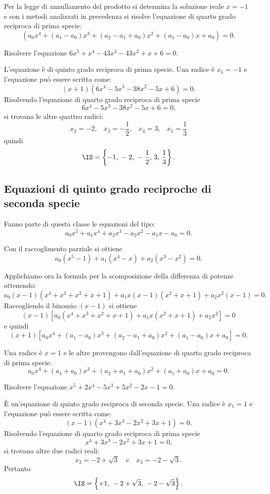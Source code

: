 Per la legge di annullamento del prodotto si determina la soluzione reale $x=-1$ e con i metodi analizzati in precedenza si risolve l'equazione di quarto grado reciproca di prima specie: 
\[\left(a_0x^4+(a_1-a_0)x^3+(a_2-a_1+a_0)x^2+(a_1-a_0)x+a_0\right)=0.\]
\pagebreak
\begin{exrig}
 \begin{esempio}
 Risolvere l'equazione $6x^5+x^4-43x^3-43x^2+x+6=0$.

 L'equazione è di quinto grado reciproca di prima specie. Una radice è $x_1=-1$ e l'equazione può essere scritta come: 
\[(x+1)\left(6x^4-5x^3-38x^2-5x+6\right)=0.\]
 Risolvendo l'equazione di quarto grado reciproca di prima specie 
\[6x^4-5x^3-38x^2-5x+6=0\text{,}\] 
si trovano le altre quattro radici: 
\[x_2=-2\text{,}\quad x_3=-\frac 1 2\text{,}\quad x_4=3\text{,}\quad x_5=\frac{1}{3}\] quindi 
\[\IS=\left\{-1\text{, }-2\text{, }-\frac 1 2\text{, }3\text{, }\frac 1 3\right\}.\]
 \end{esempio}
\end{exrig}

\subsection{Equazioni di quinto grado reciproche di seconda specie}
Fanno parte di questa classe le equazioni del tipo:
\[a_0x^5+a_1x^4+a_2x^3-a_2x^2-a_1x-a_0=0.\]

Con il raccoglimento parziale si ottiene 
\[a_0\left(x^5-1\right)+a_1\left(x^4-x\right)+a_2\left(x^3-x^2\right)=0.\]

 Applichiamo ora la formula per la scomposizione della differenza di potenze ottenendo: 
\[a_0(x-1)\left(x^4+x^3+x^2+x+1\right)+a_1x(x-1)\left(x^2+x+1\right)+a_2x^2(x-1)=0.\] 
Raccogliendo il binomio $(x-1)$ si ottiene 
\[(x-1)\left[a_0\left(x^4+x^3+x^2+x+1\right)+a_1x\left(x^2+x+1\right)+a_2x^2\right]=0\] e quindi 
\[(x+1)\left[a_0x^4+(a_1-a_0)x^3+(a_2-a_1+a_0)x^2+(a_1-a_0)x+a_0\right]=0.\]

Una radice è $x=1$ e le altre provengono dall'equazione di quarto grado reciproca di prima specie: \[a_0x^4+(a_1+a_0)x^3+(a_2+a_1+a_0)x^2+(a_1+a_0)x+a_0=0.\]
\pagebreak
\begin{exrig}
 \begin{esempio}
 Risolvere l'equazione $x^5+2x^4-5x^3+5x^2-2x-1=0$.

 È un'equazione di quinto grado reciproca di seconda specie. Una radice è $x_1=1$ e l'equazione può essere scritta come: 
\[(x-1)\left(x^4+3x^3-2x^2+3x+1\right)=0.\] 
Risolvendo l'equazione di quarto grado reciproca di prima specie 
\[x^4+3x^3-2x^2+3x+1=0\text{,}\] si trovano altre due radici reali: 
\[x_2=-2+\sqrt 3\quad\text{e}\quad x_3=-2-\sqrt 3.\] 
Pertanto 
\[\IS=\left\{+1\text{, }-2+\sqrt 3\text{, }-2-\sqrt 3\right\}.\]
 \end{esempio}
\end{exrig}

